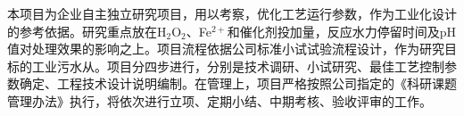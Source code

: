 本项目为企业自主独立研究项目，用以考察，优化工艺运行参数，作为工业化设计的参考依据。研究重点放在H$_2$O$_2$、Fe$^{2+}$和催化剂投加量，反应水力停留时间及pH值对处理效果的影响之上。项目流程依据公司标准小试试验流程设计，作为研究目标的工业污水从。项目分四步进行，分别是技术调研、小试研究、最佳工艺控制参数确定、工程技术设计说明编制。在管理上，项目严格按照公司指定的《科研课题管理办法》执行，将依次进行立项、定期小结、中期考核、验收评审的工作。
